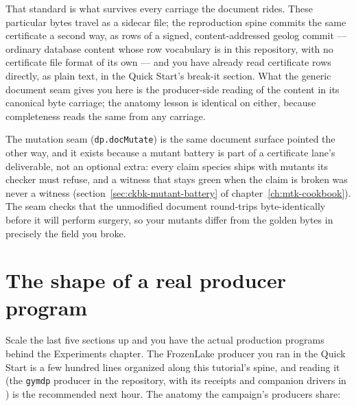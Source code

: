 That standard is what survives every carriage the document rides.
These particular bytes travel as a sidecar file; the reproduction
spine commits the same certificate a second way, as rows of a
signed, content-addressed geolog commit --- ordinary database
content whose row vocabulary is  in this
repository, with no certificate file format of its own --- and you
have already read certificate rows directly, as plain text, in the
Quick Start's break-it section. What the generic document seam gives
you here is the producer-side reading of the content in its
canonical byte carriage; the anatomy lesson is identical on either,
because completeness reads the same from any carriage.

The mutation seam (\texttt{dp.docMutate}) is the same document
surface pointed the other way, and it exists because a mutant
battery is part of a certificate lane's deliverable, not an optional
extra: every claim species ships with mutants its checker must
refuse, and a witness that stays green when the claim is broken was
never a witness (section~\ref{sec:ckbk-mutant-battery} of
chapter~\ref{ch:mtk-cookbook}). The seam checks that the unmodified
document round-trips byte-identically before it will perform
surgery, so your mutants differ from the golden bytes in precisely
the field you broke.

\section{The shape of a real producer program}
\label{sec:tut-program}

Scale the last five sections up and you have the actual production
programs behind the Experiments chapter. The FrozenLake producer you
ran in the Quick Start is a few hundred lines organized along this
tutorial's spine, and reading it (the \texttt{gymdp} producer in the
 repository, with its receipts and
companion drivers in ) is
the recommended next hour. The anatomy the campaign's producers
share:

